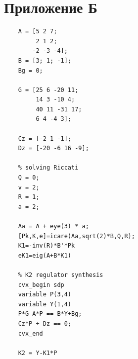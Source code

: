 \documentclass[a4paper, 12pt]{article}
\begin{document}
    \section{Приложение Б}
    \begin{lstlisting}[label=task2, caption={Программа для задания 2}]
    % plant parameters
    A = [5 2 7;
         2 1 2;
        -2 -3 -4];
    B = [3; 1; -1];
    Bg = 0;

    G = [25 6 -20 11;
         14 3 -10 4;
         40 11 -31 17;
         6 4 -4 3];

    Cz = [-2 1 -1];
    Dz = [-20 -6 16 -9];

    % solving Riccati
    Q = 0;
    v = 2;
    R = 1;
    a = 2;

    Aa = A + eye(3) * a;
    [Pk,K,e]=icare(Aa,sqrt(2)*B,Q,R);
    K1=-inv(R)*B'*Pk
    eK1=eig(A+B*K1)

    % K2 regulator synthesis
    cvx_begin sdp
    variable P(3,4)
    variable Y(1,4)
    P*G-A*P == B*Y+Bg;
    Cz*P + Dz == 0;
    cvx_end

    K2 = Y-K1*P
    \end{lstlisting}
\end{document}
